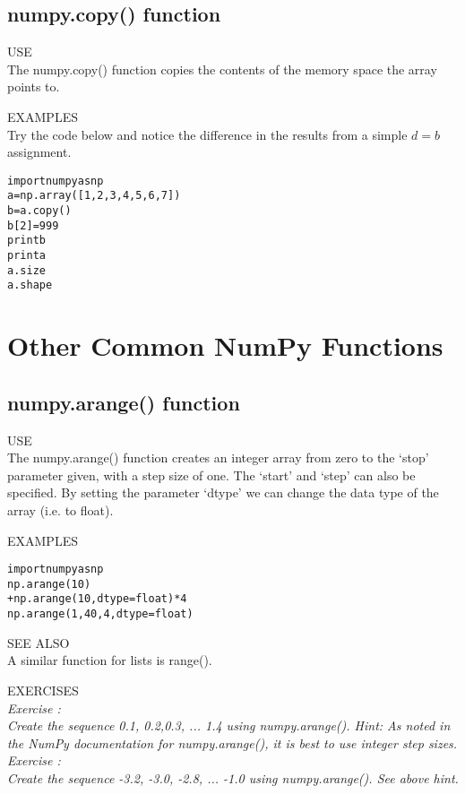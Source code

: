\subsection{ {\sf numpy.copy() } function}
\label{s:copy}
{\color{blue} {\sf\small USE}} \\
The {\sf\small numpy.copy()} function copies the contents of the
memory space the array points to. 

{\color{blue} {\sf\small EXAMPLES}} \\
Try the code below and notice the difference in the results from a
simple $d = b$ assignment.
\begin{alltt}
\pytab import numpy as np
\pytab a = np.array([1,2,3,4,5,6,7]) 
\pytab b = a.copy()  
\pytab b[2] = 999  
\pytab print b  
\pytab print a
\pytab a.size
\pytab a.shape
\end{alltt}

\section{Other Common NumPy Functions}
\subsection{ {\sf numpy.arange() } function}
{\color{blue} {\sf\small USE}} \\
The {\sf\small numpy.arange()} function creates an integer array
from zero to the `stop' parameter given, with a step size of one.
The `start' and `step' can also be specified.  By setting the parameter
`dtype' we can change the data type of the array (i.e. to float).

{\color{blue} {\sf\small EXAMPLES}} 
\begin{alltt}
\pytab import numpy as np 
\pytab np.arange(10) 
 + np.arange(10, dtype=float) * 4 
\pytab np.arange(1,40,4,dtype=float)
\end{alltt}
{\color{blue} {\sf\small SEE ALSO}} \\
A similar function for lists is {\sf\small range()}.

{\color{blue} {\sf\small EXERCISES}} \\
{\it Exercise  :  \\
Create the  sequence 0.1, 0.2,0.3, ... 1.4  using {\sf\small
  numpy.arange()}.  Hint: As noted in the NumPy documentation for
numpy.arange(), it is best to use integer step sizes.} \\
{\it Exercise  :  \\
Create the  sequence -3.2, -3.0, -2.8, ... -1.0  using {\sf\small
  numpy.arange()}.  See above hint.}

